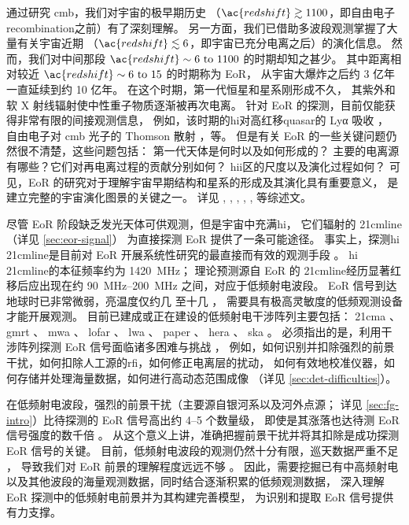 通过研究 \ac{cmb}，我们对宇宙的极早期历史
（$\ac{redshift} \gtrsim 1100$，即自由电子\ac{recombination}之前）有了深刻理解。
另一方面，我们已借助多波段观测掌握了大量有关宇宙近期
（$\ac{redshift} \lesssim 6$，即宇宙已充分电离之后）的演化信息。
然而，我们对中间那段 $\ac{redshift} \sim \numrange{6}{1100}$ 的时期却知之甚少。
其中距离相对较近 $\ac{redshift} \sim \numrange{6}{15}$ 的时期称为 EoR，
从宇宙大爆炸之后约 3 亿年一直延续到约 10 亿年。
在这个时期，第一代恒星和星系刚形成不久，
其紫外和软 X 射线辐射使中性重子物质逐渐被再次电离。
针对 EoR 的探测，目前仅能获得非常有限的间接观测信息，
例如，该时期的\ac{hi}对高红移\ac{quasar}的 Lyα 吸收 \cite{becker2001}，
自由电子对 \ac{cmb} 光子的 Thomson 散射 \cite{kaplinghat2003}，等。
但是有关 EoR 的一些关键问题仍然很不清楚，这些问题包括：
第一代天体是何时以及如何形成的？
主要的电离源有哪些？它们对再电离过程的贡献分别如何？
\ac{hii}区的尺度以及演化过程如何？
可见，EoR 的研究对于理解宇宙早期结构和星系的形成及其演化具有重要意义，
是建立完整的宇宙演化图景的关键之一。
详见 , ,
, ,
,  等综述文。

尽管 EoR 阶段缺乏发光天体可供观测，但是宇宙中充满\ac{hi}，
它们辐射的 \ac{21cmline}（详见 \autoref{sec:eor-signal}）
为直接探测 EoR 提供了一条可能途径。
事实上，探测\ac{hi} \ac{21cmline}是目前对 EoR 开展系统性研究的最直接而有效的观测手段
\cite{madau1997,tozzi2000,furlanetto2006,koopmans2015,furlanetto2016}。
\ac{hi} \ac{21cmline}的本征频率约为 \SI{1420}{\MHz}；
理论预测源自 EoR 的 \ac{21cmline}经历显著红移后应出现在约
\SIrange{90}{200}{\MHz} 之间，对应于低频射电波段。
EoR 信号到达地球时已非常微弱，亮温度仅约几 \si{\mK} 至十几 \si{\mK}，
需要具有极高灵敏度的低频观测设备才能开展观测。
目前已建成或正在建设的低频射电干涉阵列主要包括：
\ac{21cma} \cite{zheng2016}、
\ac{gmrt} \cite{paciga2011}、
\ac{mwa} \cite{bowman2013,tingay2013}、
\ac{lofar} \cite{vanHaarlem2013}、
\ac{lwa} \cite{ellingson2009}、
\ac{paper} \cite{parsons2010}、
\ac{hera} \cite{deBoer2017}、
\ac{ska} \cite{mellema2013,koopmans2015}。
必须指出的是，利用干涉阵列探测 EoR 信号面临诸多困难与挑战
\cite{morales2010,wijnholds2010}，
例如，如何识别并扣除强烈的前景干扰，如何扣除人工源的\ac{rfi}，如何修正电离层的扰动，
如何有效地校准仪器，如何存储并处理海量数据，如何进行高动态范围成像
（详见 \autoref{sec:det-difficulties}）。

在低频射电波段，强烈的前景干扰（主要源自银河系以及河外点源；
详见 \autoref{sec:fg-intro}）比待探测的 EoR 信号高出约 4--5 个数量级，
即使是其涨落也达待测 EoR 信号强度的数千倍 \cite{zaroubi2013}。
从这个意义上讲，准确把握前景干扰并将其扣除是成功探测 EoR 信号的关键。
目前，低频射电波段的观测仍然十分有限，巡天数据严重不足
\cite{deOliveiraCosta2008,zheng2017gal}，
导致我们对 EoR 前景的理解程度远远不够
\cite{liu2012,harker2015,offringa2016,murray2017,procopio2017}。
因此，需要挖掘已有中高频射电以及其他波段的海量观测数据，同时结合逐渐积累的低频观测数据，
深入理解 EoR 探测中的低频射电前景并为其构建完善模型，
为识别和提取 EoR 信号提供有力支撑。


